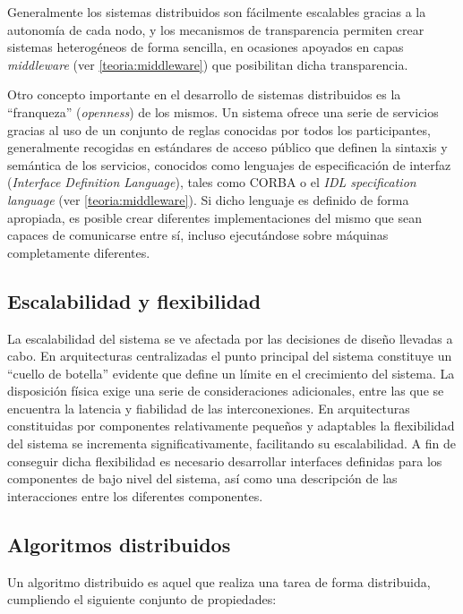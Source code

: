 Generalmente los sistemas distribuidos son fácilmente escalables gracias a la autonomía de cada nodo, y los mecanismos de transparencia permiten crear sistemas heterogéneos de forma sencilla, en ocasiones apoyados en capas \textit{middleware} (ver \ref{teoria:middleware}) que posibilitan dicha transparencia.

Otro concepto importante en el desarrollo de sistemas distribuidos es la ``franqueza'' (\textit{openness}) de los mismos. Un sistema ofrece una serie de servicios gracias al uso de un conjunto de reglas conocidas por todos los participantes, generalmente recogidas en estándares de acceso público que definen la sintaxis y semántica de los servicios, conocidos como lenguajes de especificación de interfaz (\textit{Interface Definition Language}), tales como CORBA\cite{corba} o el \textit{IDL specification language}\cite{idl} (ver \ref{teoria:middleware}). Si dicho lenguaje es definido de forma apropiada, es posible crear diferentes implementaciones del mismo que sean capaces de comunicarse entre sí, incluso ejecutándose sobre máquinas completamente diferentes.

\subsection{Escalabilidad y flexibilidad}

La escalabilidad del sistema se ve afectada por las decisiones de diseño llevadas a cabo. En arquitecturas centralizadas el punto principal del sistema constituye un ``cuello de botella'' evidente que define un límite en el crecimiento del sistema. La disposición física exige una serie de consideraciones adicionales, entre las que se encuentra la latencia y fiabilidad de las interconexiones. En arquitecturas constituidas por componentes relativamente pequeños y  adaptables la flexibilidad del sistema se incrementa significativamente, facilitando su escalabilidad. A fin de conseguir dicha flexibilidad es necesario desarrollar interfaces definidas para los componentes de bajo nivel del sistema, así como una descripción de las interacciones entre los diferentes componentes.

\subsection{Algoritmos distribuidos}

Un algoritmo distribuido es aquel que realiza una tarea de forma distribuida, cumpliendo el siguiente conjunto de propiedades:

